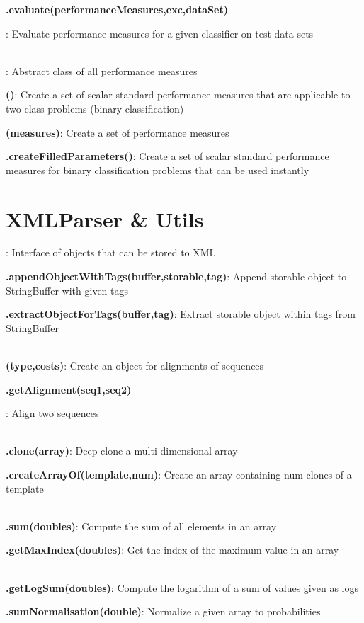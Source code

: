 \documentclass[10pt]{scrartcl}
\newcommand{\entry}[3]{{\item[]\bfseries #1#2}: #3}
\newcommand{\entrys}[3]{\item[\emph{static}] {\bfseries {#1#2}}: #3}
\newcommand{\entryn}[3]{\item[new] {\bfseries {#1#2}}: #3}
\newcommand{\sep}{\\~\vspace{-0.1cm}}
\begin{document}
\begin{flushleft}
\begin{itemize*}
\entry{\AbstractClassifier}{.evaluate(performanceMeasures,exc,dataSet)}{Evaluate performance measures for a given classifier on test data sets}\sep

\entry{\AbstractPerformanceMeasure}{}{Abstract class of all performance measures}

\entryn{\NumericalPerformanceMeasureParameterSet}{()}{Create a set of scalar standard performance measures that are applicable to two-class problems (binary classification)}

\entryn{\PerformanceMeasureParameterSet}{(measures)}{Create a set of performance measures}

\entrys{\PerformanceMeasureParameterSet}{.createFilledParameters()}{Create a set of scalar standard performance measures for binary classification problems that can be used instantly}

\end{itemize*}

\section{XMLParser \& Utils}

\begin{itemize*}

\entry{\Storable}{}{Interface of objects that can be stored to XML}

\entrys{\XMLParser}{.appendObjectWithTags(buffer,storable,tag)}{Append storable object to StringBuffer with given tags}

\entrys{\XMLParser}{.extractObjectForTags(buffer,tag)}{Extract storable object within tags from StringBuffer}\sep

\entryn{\Alignment}{(type,costs)}{Create an object for alignments of sequences}

\entry{\Alignment}{.getAlignment(seq1,seq2)}{Align two sequences}\sep

\entrys{\ArrayHandler}{.clone(array)}{Deep clone a multi-dimensional array}

\entrys{\ArrayHandler}{.createArrayOf(template,num)}{Create an array containing num clones of a template}\sep

\entrys{\ToolBox}{.sum(doubles)}{Compute the sum of all elements in an array}

\entrys{\ToolBox}{.getMaxIndex(doubles)}{Get the index of the maximum value in an array}\sep

\entrys{\Normalisation}{.getLogSum(doubles)}{Compute the logarithm of a sum of values given as logs}

\entrys{\Normalisation}{.sumNormalisation(double)}{Normalize a given array to probabilities}

\end{itemize*}

\end{flushleft}
\end{document}
